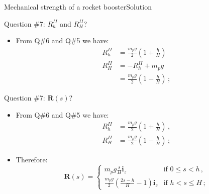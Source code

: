 \documentclass{beamer}
\newcommand{\zj}{z}
\renewcommand{\ij}{i}
\newcommand{\iv}{{\boldsymbol\ij}}
\newcommand{\Rj}{R}
\newcommand{\Fresj}{R}
\newcommand{\Fres}{{\boldsymbol\Fresj}}
\begin{document}
\begin{frame}{Mechanical strength of a rocket booster}{Solution}

\begin{overprint}

\vskip-20pt
\begin{exampleblock}{Question \#7: $\Rj_h^{II}$ and $\Rj_H^{II}$?}
\begin{itemize}
\item From Q\#6 and Q\#5 we have:
\begin{displaymath}
\begin{split}
\Rj_h^{II} &=\frac{m_pg}{2}\left(1+\frac{h}{H}\right) \\
\Rj_H^{II} &=-\Rj_h^{II}+m_p g \\
&=\frac{m_pg}{2}\left(1-\frac{h}{H}\right)\,;
\end{split}
\end{displaymath}
\end{itemize}
\end{exampleblock}

\vskip-20pt
\begin{exampleblock}{Question \#7: $\Fres(s)$?}
\begin{itemize}
\item From Q\#6 and Q\#5 we have:
\begin{displaymath}
\begin{split}
\Rj_h^{II} &=\frac{m_pg}{2}\left(1+\frac{h}{H}\right)\,, \\
\Rj_H^{II} &=\frac{m_pg}{2}\left(1-\frac{h}{H}\right)\,;
\end{split}
\end{displaymath}
\item Therefore:
\begin{displaymath}
\Fres(s)=\left\{\begin{array}{ll}
\displaystyle m_pg\frac{s}{H}\iv_\zj & \text{if $0\leq s< h$}\,, \\
\displaystyle \frac{m_pg}{2}\left(\frac{2s-h}{H}-1\right)\iv_\zj & \text{if $h< s\leq H$}\,;
\end{array}\right.
\end{displaymath}
\end{itemize}
\end{exampleblock}


\end{overprint}
\end{frame}
\end{document}
